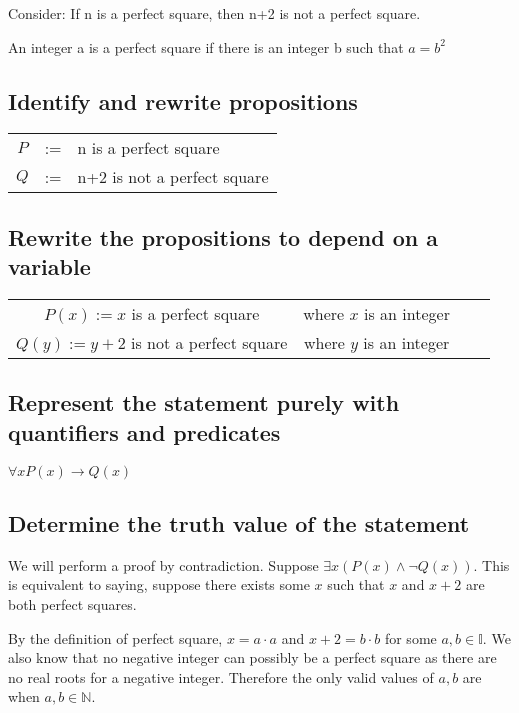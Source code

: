 Consider: If n is a perfect square, then n+2 is not a perfect square.

\begin{definition}
  An integer a is a perfect square if there is an integer b such that $a=b^2$
\end{definition}

\subsection{Identify and rewrite propositions}
\begin{center}
  \begin{tabular}{ccl}
    $P$ & := & n is a perfect square \\
    $Q$ & := &  n+2 is not a perfect square \\
  \end{tabular}
\end{center}

\subsection{Rewrite the propositions to depend on a variable}
\begin{center}
  \begin{tabular}{ccll}
    $P(x) := x$ is a perfect square & where $x$ is an integer \\
    $Q(y) := y + 2$ is not a perfect square & where $y$ is an integer \\
  \end{tabular}
\end{center}

\subsection{Represent the statement purely with quantifiers and predicates}
\begin{center}
  $\forall x P(x) \rightarrow Q(x)$
\end{center}

\subsection{Determine the truth value of the statement}
\raggedright
We will perform a proof by contradiction. Suppose $\exists x (P(x) \land \lnot Q(x))$. This is equivalent to saying, suppose there exists some $x$ such that $x$ and $x+2$ are both perfect squares.

By the definition of perfect square, $x=a\cdot a$ and $x+2=b\cdot b$ for some $a,b \in \mathbb{I}$. We also know that no negative integer can possibly be a perfect square as there are no real roots for a negative integer. Therefore the only valid values of $a,b$ are when $a,b \in \mathbb{N}$.

